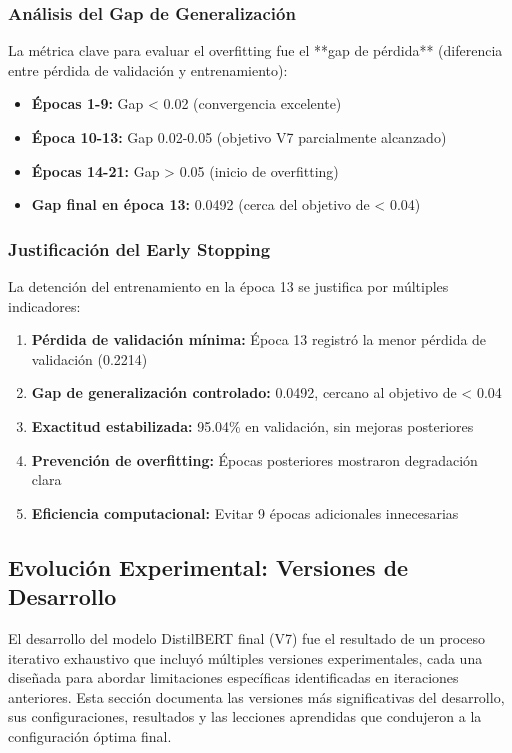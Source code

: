 \subsubsection{Análisis del Gap de Generalización}

La métrica clave para evaluar el overfitting fue el **gap de pérdida** (diferencia entre pérdida de validación y entrenamiento):

\begin{itemize}
    \item \textbf{Épocas 1-9:} Gap < 0.02 (convergencia excelente)
    \item \textbf{Época 10-13:} Gap 0.02-0.05 (objetivo V7 parcialmente alcanzado)
    \item \textbf{Épocas 14-21:} Gap > 0.05 (inicio de overfitting)
    \item \textbf{Gap final en época 13:} 0.0492 (cerca del objetivo de < 0.04)
\end{itemize}

\subsubsection{Justificación del Early Stopping}

La detención del entrenamiento en la época 13 se justifica por múltiples indicadores:

\begin{enumerate}
    \item \textbf{Pérdida de validación mínima:} Época 13 registró la menor pérdida de validación (0.2214)
    \item \textbf{Gap de generalización controlado:} 0.0492, cercano al objetivo de < 0.04
    \item \textbf{Exactitud estabilizada:} 95.04\% en validación, sin mejoras posteriores
    \item \textbf{Prevención de overfitting:} Épocas posteriores mostraron degradación clara
    \item \textbf{Eficiencia computacional:} Evitar 9 épocas adicionales innecesarias
\end{enumerate}

\subsection{Evolución Experimental: Versiones de Desarrollo}
\label{subsec:evolucion_experimental_distilbert}

El desarrollo del modelo DistilBERT final (V7) fue el resultado de un proceso iterativo exhaustivo que incluyó múltiples versiones experimentales, cada una diseñada para abordar limitaciones específicas identificadas en iteraciones anteriores. Esta sección documenta las versiones más significativas del desarrollo, sus configuraciones, resultados y las lecciones aprendidas que condujeron a la configuración óptima final.

